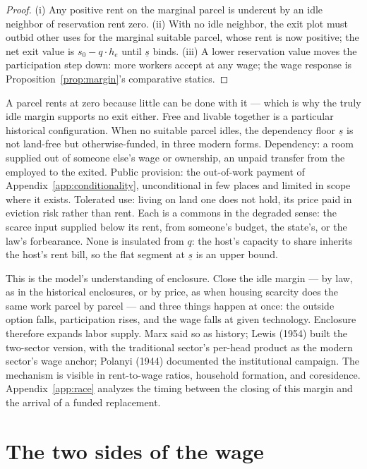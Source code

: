 \documentclass[12pt]{article}
\theoremstyle{plain}
\begin{document}
\begin{proof}
(i) Any positive rent on the marginal parcel is undercut by an idle neighbor of reservation rent zero. (ii) With no idle neighbor, the exit plot must outbid other uses for the marginal suitable parcel, whose rent is now positive; the net exit value is $s_0 - q\cdot h_e$ until $\underline{s}$ binds. (iii) A lower reservation value moves the participation step down: more workers accept at any wage; the wage response is Proposition~\ref{prop:margin}'s comparative statics.
\end{proof}

A parcel rents at zero because little can be done with it --- which is why the truly idle margin supports no exit either. Free and livable together is a particular historical configuration. When no suitable parcel idles, the dependency floor $\underline{s}$ is not land-free but otherwise-funded, in three modern forms. Dependency: a room supplied out of someone else's wage or ownership, an unpaid transfer from the employed to the exited. Public provision: the out-of-work payment of Appendix~\ref{app:conditionality}, unconditional in few places and limited in scope where it exists. Tolerated use: living on land one does not hold, its price paid in eviction risk rather than rent. Each is a commons in the degraded sense: the scarce input supplied below its rent, from someone's budget, the state's, or the law's forbearance. None is insulated from $q$: the host's capacity to share inherits the host's rent bill, so the flat segment at $\underline{s}$ is an upper bound.

This is the model's understanding of enclosure. Close the idle margin --- by law, as in the historical enclosures, or by price, as when housing scarcity does the same work parcel by parcel --- and three things happen at once: the outside option falls, participation rises, and the wage falls at given technology. Enclosure therefore expands labor supply. Marx said so as history; Lewis (1954) built the two-sector version, with the traditional sector's per-head product as the modern sector's wage anchor; Polanyi (1944) documented the institutional campaign. The mechanism is visible in rent-to-wage ratios, household formation, and coresidence. Appendix~\ref{app:race} analyzes the timing between the closing of this margin and the arrival of a funded replacement.

\section{The two sides of the wage}\label{sec:interval}
\end{document}
